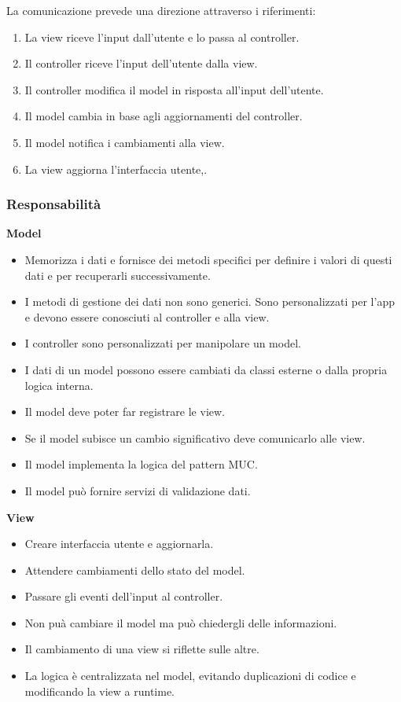 \documentclass{report}
\begin{document}
\noindent
La comunicazione prevede una direzione attraverso i riferimenti:
\begin{enumerate}
    \item La view riceve l'input dall'utente e lo passa al controller.
    \item Il controller riceve l'input dell'utente dalla view.
    \item Il controller modifica il model in risposta all'input dell'utente.
    \item Il model cambia in base agli aggiornamenti del controller.
    \item Il model notifica i cambiamenti alla view.
    \item La view aggiorna l'interfaccia utente,.
\end{enumerate}

\subsubsection*{Responsabilità}
\textbf{Model}
\begin{itemize}
    \item Memorizza i dati e fornisce dei metodi specifici per definire i valori di questi dati e per recuperarli successivamente.
    \item I metodi di gestione dei dati non sono generici. Sono personalizzati per l'app e devono essere conosciuti al controller e alla view.
    \item I controller sono personalizzati per manipolare un model.
    \item I dati di un model possono essere cambiati da classi esterne o dalla propria logica interna.
    \item Il model deve poter far registrare le view.
    \item Se il model subisce un cambio significativo deve comunicarlo alle view.
    \item Il model implementa la logica del pattern MUC.
    \item Il model può fornire servizi di validazione dati.
\end{itemize}

\medskip
\noindent
\textbf{View}
\begin{itemize}
    \item Creare interfaccia utente e aggiornarla.
    \item Attendere cambiamenti dello stato del model.
    \item Passare gli eventi dell'input al controller.
    \item Non puà cambiare il model ma può chiedergli delle informazioni.
    \item Il cambiamento di una view si riflette sulle altre.
    \item La logica è centralizzata nel model, evitando duplicazioni di codice e modificando la view a runtime.
\end{itemize}
\end{document}
